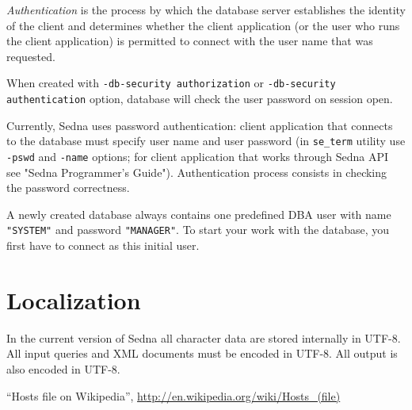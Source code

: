 \documentclass[a4paper,12pt]{article}
\begin{document}
\emph{Authentication} is the process by which the database server establishes
the identity of the client and determines whether the client application (or the
user who runs the client application) is permitted to connect with the user name
that was requested.

When created with \verb!-db-security authorization! or
\verb!-db-security authentication! option, database will check the user password
on session open.

Currently, Sedna uses password authentication: client application that connects
to the database must specify user name and user password (in \verb!se_term!
utility use \verb!-pswd! and \verb!-name! options; for client application that
works through Sedna API see "Sedna Programmer's Guide"). Authentication process
consists in checking the password correctness.

A newly created database always contains one predefined DBA user with name
\verb!"SYSTEM"! and password \verb!"MANAGER"!. To start your work with the
database, you first have to connect as this initial user.


\section{Localization}

In the current version of Sedna all character data are stored internally in
UTF-8. All input queries and XML documents must be encoded in UTF-8. All output
is also encoded in UTF-8.


\begin{thebibliography}{9}
``Hosts file on Wikipedia'',
\url{http://en.wikipedia.org/wiki/Hosts_(file)}

\end{thebibliography}
\end{document}

